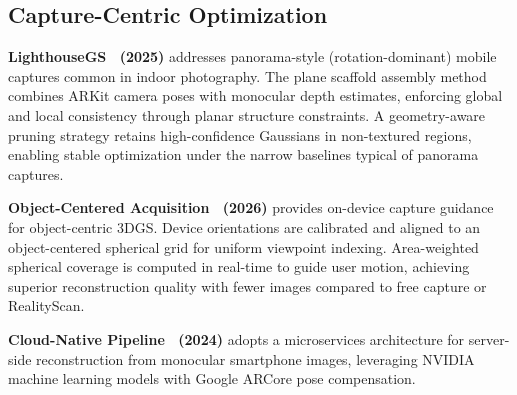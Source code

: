 \documentclass[journal]{IEEEtran}
\begin{document}
\subsection{Capture-Centric Optimization}

\textbf{LighthouseGS~\cite{lighthousegs} (2025)} addresses panorama-style (rotation-dominant) mobile captures common in indoor photography. The plane scaffold assembly method combines ARKit camera poses with monocular depth estimates, enforcing global and local consistency through planar structure constraints. A geometry-aware pruning strategy retains high-confidence Gaussians in non-textured regions, enabling stable optimization under the narrow baselines typical of panorama captures.

\textbf{Object-Centered Acquisition~\cite{objacq} (2026)} provides on-device capture guidance for object-centric 3DGS. Device orientations are calibrated and aligned to an object-centered spherical grid for uniform viewpoint indexing. Area-weighted spherical coverage is computed in real-time to guide user motion, achieving superior reconstruction quality with fewer images compared to free capture or RealityScan.

\textbf{Cloud-Native Pipeline~\cite{cloudnative} (2024)} adopts a microservices architecture for server-side reconstruction from monocular smartphone images, leveraging NVIDIA machine learning models with Google ARCore pose compensation.
\end{document}
